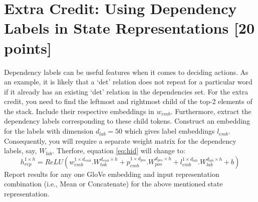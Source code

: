 \section{Extra Credit: Using Dependency Labels in State Representations [20 points]}
Dependency labels can be useful features when it comes to deciding actions. As an example, it is likely that a `det' relation does not repeat for a particular word if it already has an existing `det' relation in the dependencies set. For the extra credit, you need to find the leftmost and rightmost child of the top-2 elements of the stack. Include their respective embeddings in $w_{emb}$. Furthermore, extract the dependency labels corresponding to these child tokens. Construct an embedding for the labels with dimension $d_{lab}=50$ which gives label embeddings $l_{emb}$. Consequently, you will require a separate weight matrix for the dependency labels, say, $W_{lab}$. Therfore, equation \ref{eq:hid} will change to: 
\begin{equation}
    h_{rep}^{1\times h} = ReLU(w_{emb}^{1\times d_{emb}}.W_{tok}^{d_{emb}\times h} + p_{emb}^{1\times d_{pos}}.W_{pos}^{d_{pos}\times h} + l_{emb}^{1\times d_{lab}}.W_{lab}^{d_{lab}\times h} + b )
    \label{eq:hid}
\end{equation}
Report results for any one GloVe embedding and input representation combination (i.e., Mean or Concatenate) for the above mentioned state representation.